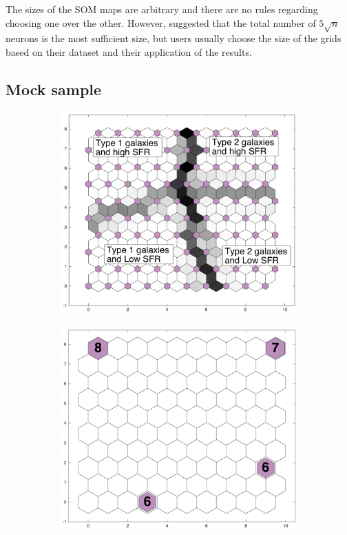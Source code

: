     The sizes of the SOM maps are arbitrary and there are no rules regarding choosing one over the other. 
    However, \cite{Vesanto05} suggested that the total number of $5\sqrt{n}$ neurons is the most sufficient size, but users usually choose the size of the grids based on their dataset and their application of the results.

   
\subsection{Mock sample}
 
         \begin{figure}
            \begin{subfigure}[b]{0.5\textwidth}
                \centering
                \includegraphics[width=\textwidth]{images0.01/sample/sample2_dist.png}
            \end{subfigure}
            \hfill
            \begin{subfigure}[b]{0.5\textwidth}
                \includegraphics[width=\textwidth]{images0.01/sample/sample2_hits.png}

\end{subfigure}
\end{figure}
